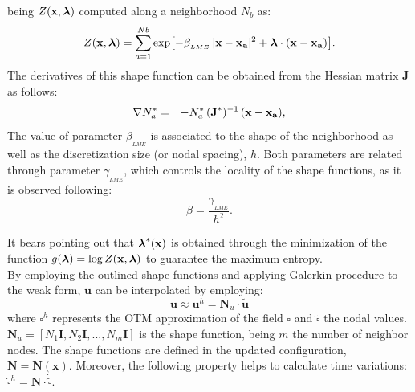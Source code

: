 \documentclass[applsci,journal,article,submit,moreauthors,pdftex]{Definitions/mdpi}
\begin{document}
being $Z({\bf x}, {\boldsymbol{\lambda}})$ computed along a neighborhood $N_b$ as:
\begin{equation}\label{eq_N2}
Z({\bf x}, {\boldsymbol{\lambda}}) = \sum_{a=1}^{Nb} \exp \left[ -\beta_{_{LME}} \, |{\bf x-x_a}|^2 + \boldsymbol{\lambda}  \cdot  {\bf(x-x_a)}         \right].
\end{equation}
The derivatives of this shape function can be obtained from the Hessian matrix \textbf{J} as follows:
\begin{eqnarray}
\nabla N^*_a &=& -N^*_a \,  (\textbf{J}^*)^{-1} \,  (\bf x-x_a) \label{eq_N3} ,
\end{eqnarray}
The value of parameter $\beta_{_{LME}}$ is associated to the shape of the neighborhood as well as the discretization size (or nodal spacing), $h$. Both parameters are related through parameter $\gamma_{_{LME}}$, which controls the locality of the shape functions, as it is observed following:
\begin{equation}\label{eqLM3}
\beta=\frac{\gamma_{_{LME}}}{h^2}.
\end{equation} 

It bears pointing out that $\boldsymbol{\lambda}^*(\bf x)$ is obtained through the minimization of the function $g(\boldsymbol{\lambda})=\log Z(\bf x, \boldsymbol{\lambda})$ to guarantee the maximum entropy.\\

By employing the outlined shape functions and applying Galerkin procedure to the weak form, $\boldsymbol{u}$ can be interpolated by employing:
\begin{equation} \label{eq_uwp1}
\boldsymbol{u} \approx  \boldsymbol{u}^h = \boldsymbol{N}_u \cdot \tilde{ \boldsymbol{u} }
\end{equation}
where $\square^h$ represents the OTM approximation of the field $\square$ and $\tilde{ \square } $ the nodal values.  $\boldsymbol{N}_u = [N_1 \boldsymbol{I}, N_2 \boldsymbol{I}, ..., N_m \boldsymbol{I}]$ is the shape function, being $m$ the number of neighbor nodes. The shape functions are defined in the updated configuration, $\boldsymbol{N} = \boldsymbol{N}(\boldsymbol{x})$. Moreover, the following property helps to calculate time variations:  $\dot{\square}^h =\boldsymbol{N} \cdot \dot{\tilde{\square}}$.
  
\end{document}
